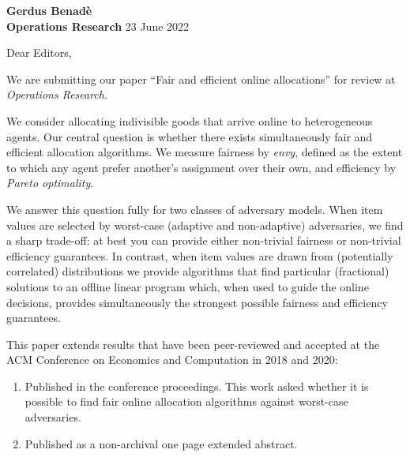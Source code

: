 
\begin{flushright}
	\textbf{Gerdus Benad\`e}\\
 \textbf{Operations Research} \hfill	23 June 2022
\end{flushright}


Dear Editors,  \smallskip

We  are submitting our paper ``{Fair and efficient online allocations}'' for review at  \textit{Operations Research}.
 

We consider allocating indivisible goods that arrive online to heterogeneous agents. Our central question is whether there exists simultaneously fair and efficient allocation algorithms. We measure fairness by \emph{envy}, defined as the extent to which any agent prefer another's assignment over their own, and efficiency by  \emph{Pareto optimality}. 

We answer this question fully for two classes of adversary models. When item values are selected by worst-case (adaptive and non-adaptive) adversaries, we find a sharp trade-off: at best you can provide either non-trivial fairness  or non-trivial efficiency guarantees. In contrast, when item values are drawn from (potentially correlated) distributions we provide   algorithms that find    particular  (fractional)  solutions to an offline linear program which, when used to guide the online decisions, provides simultaneously the strongest possible fairness and efficiency guarantees. 

This paper extends results that have been peer-reviewed and accepted at the ACM Conference on Economics and Computation in 2018 and 2020: 
\begin{enumerate}[topsep=0pt, partopsep=0pt, itemsep=0pt]
	\item[\cite{BKPP18}] Published in the conference proceedings. This work asked whether it is possible to find fair online allocation algorithms   against worst-case adversaries. 
	\item[\cite{PZ20}] Published  as a non-archival one page extended abstract. 
\end{enumerate}

